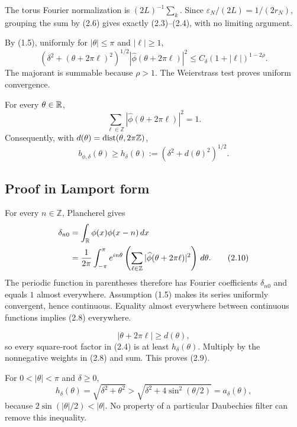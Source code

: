 \documentclass[11pt,a4paper]{article}
\newcommand{\eps}{\varepsilon}
\newcommand{\dd}{\,d}
\begin{document}

The torus Fourier normalization is $(2L)^{-1}\sum_k$.  Since
$\eps_N/(2L)=1/(2r_N)$, grouping the sum by (2.6) gives exactly
(2.3)--(2.4), with no limiting argument.


By (1.5), uniformly for $|\theta|\leq\pi$ and $|\ell|\geq1$,
\[
 \left(\delta^2+(\theta+2\pi\ell)^2\right)^{1/2}
 |\widehat\phi(\theta+2\pi\ell)|^2
 \leq C_{\delta} (1+|\ell|)^{1-2\rho}.
\]
The majorant is summable because $\rho>1$.  The Weierstrass test proves uniform
convergence. \QedStep

\begin{lemma}\label{lem:alias}
For every $\theta\in\mathbb R$,
\[
 \sum_{\ell\in\mathbb Z}
 |\widehat\phi(\theta+2\pi\ell)|^2=1.                            \tag{2.8}
\]
Consequently, with $d(\theta)=\operatorname{dist}(\theta,2\pi\mathbb Z)$,
\[
 b_{\phi,\delta}(\theta)
 \geq h_\delta(\theta):=\left(\delta^2+d(\theta)^2\right)^{1/2}. \tag{2.9}
\]
\end{lemma}

\subsection*{Proof in Lamport form}


For every $n\in\mathbb Z$, Plancherel gives
\begin{align*}
 \delta_{n0}
 &=\int_\R\phi(x)\phi(x-n)\dd x\\
 &=\frac1{2\pi}\int_{-\pi}^{\pi}e^{in\theta}
   \left(\sum_{\ell\in\mathbb Z}
   |\widehat\phi(\theta+2\pi\ell)|^2\right)\dd\theta.         \tag{2.10}
\end{align*}
The periodic function in parentheses therefore has Fourier coefficients
$\delta_{n0}$ and equals $1$ almost everywhere.  Assumption (1.5) makes its
series uniformly convergent, hence continuous.  Equality almost everywhere between
continuous functions implies (2.8) everywhere.

\[
 |\theta+2\pi\ell|\geq d(\theta),
\]
so every square-root factor in (2.4) is at least $h_\delta(\theta)$.  Multiply by
the nonnegative weights in (2.8) and sum.  This proves (2.9). \QedStep

\begin{remark}
For $0<|\theta|<\pi$ and $\delta\geq0$,
\[
 h_\delta(\theta)=\sqrt{\delta^2+\theta^2}
 >\sqrt{\delta^2+4\sin^2(\theta/2)}=a_\delta(\theta),            \tag{2.11}
\]
because $2\sin(|\theta|/2)<|\theta|$.  No property of a particular Daubechies
filter can remove this inequality.
\end{remark}
\end{document}
